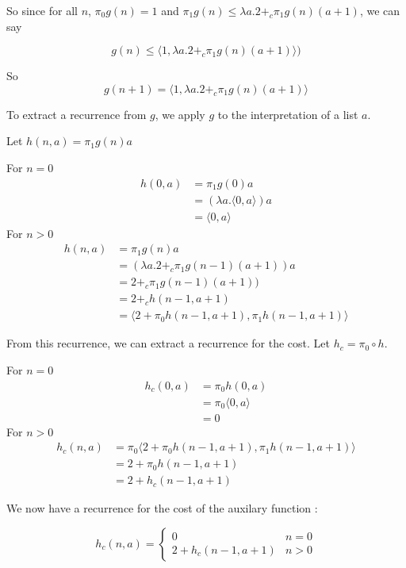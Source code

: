 So since for all $n$, $\pi_0 g(n) = 1$ and $\pi_1 g(n) \leq \lambda a. 2 +_c \pi_1 g(n) (a+1)$, we can say

\[ g(n) \leq \langle 1, \lambda a. 2 +_c \pi_1g(n) (a+1)\rangle) \]

So 
\[ g(n+1) = \langle 1, \lambda a. 2 +_c \pi_1g(n) (a+1)\rangle\]


To extract a recurrence from $g$, we apply $g$ to the interpretation of a list $a$.

Let $h(n,a) = \pi_1 g(n) a$

For $n=0$
\begin{align*}
h(0,a) &= \pi_1 g(0) a \\
&= (\lambda a.\langle 0,a\rangle) a \\
&= \langle 0, a\rangle
\end{align*}
For $n>0$
\begin{align*}
h(n,a) &= \pi_1 g(n) a \\ 
&= (\lambda a. 2 +_c \pi_1g(n-1) (a+1)) a \\
&= 2 +_c \pi_1 g(n-1) (a+1)) \\
&= 2 +_c h(n-1,a+1) \\
&= \langle 2 + \pi_0 h(n-1,a+1), \pi_1 h(n-1,a+1)\rangle
\end{align*}

From this recurrence, we can extract a recurrence for the cost. Let $h_c = \pi_0 \circ h$.

For $n=0$
\begin{align*}
h_c(0,a) &= \pi_0 h(0,a)\\
&= \pi_0 \langle 0, a\rangle\\
&= 0
\end{align*}
For $n>0$
\begin{align*}
h_c(n,a) &= \pi_0 \langle 2 + \pi_0 h(n-1,a+1), \pi_1 h(n-1,a+1)\rangle\\
&= 2 + \pi_0 h(n-1,a+1)\\
&= 2 + h_c(n-1,a+1)
\end{align*}

We now have a recurrence for the cost of the auxilary function :
\begin{framed}
  \begin{equation}
    h_c(n,a) = \begin{cases}
      0 & n = 0 \\
      2 + h_c(n-1,a+1) & n > 0
    \end{cases}
  \end{equation}
\end{framed}

